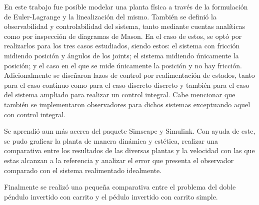 %
%

En este trabajo fue posible modelar una planta física a través de la formulación de Euler-Lagrange y la linealización del mismo. También se definió la observabilidad y controlabilidad del sistema, tanto mediante cuentas analíticas como por inspección de diagramas de Mason. En el caso de estos, se optó por realizarlos para los tres casos estudiados, siendo estos: el sistema con fricción midiendo posición y ángulos de los joints; el sistema midiendo únicamente la posición; y el caso en el que se mide únicamente la posición y no hay fricción.
Adicionalmente se diseñaron lazos de control por realimentación de estados, tanto para el caso continuo como para el caso discreto discreto y también para el caso del sistema ampliado para realizar un control integral. Cabe mencionar que también se implementaron observadores para dichos sistemas exceptuando aquel con control integral.


Se aprendió aun más acerca del paquete Simscape y Simulink. Con ayuda de este, se pudo graficar la planta de manera dinámica y estética, realizar una comparativa entre los resultados de las diversas plantas y la velocidad con las que estas alcanzan a la referencia y analizar el error que presenta el observador comparado con el sistema realimentado idealmente.

Finalmente se realizó una pequeña comparativa entre el problema del doble péndulo invertido con carrito y el pédulo invertido con carrito simple.
%